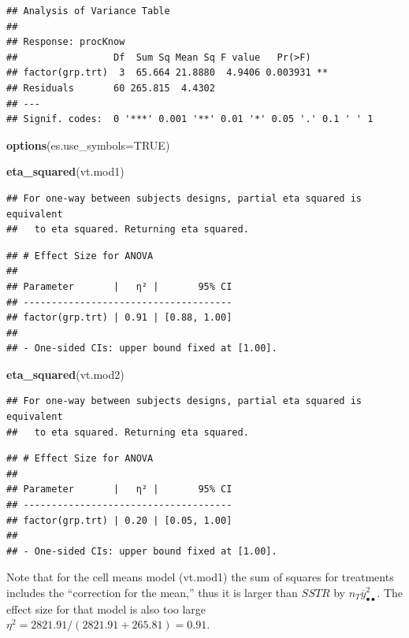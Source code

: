 \documentclass[
]{book}
\newenvironment{Shaded}{\begin{snugshade}}{\end{snugshade}}
\newcommand{\AttributeTok}[1]{\textcolor[rgb]{0.13,0.29,0.53}{#1}}
\newcommand{\ConstantTok}[1]{\textcolor[rgb]{0.56,0.35,0.01}{#1}}
\newcommand{\FunctionTok}[1]{\textcolor[rgb]{0.13,0.29,0.53}{\textbf{#1}}}
\newcommand{\NormalTok}[1]{#1}
\begin{document}
\begin{verbatim}
## Analysis of Variance Table
## 
## Response: procKnow
##                 Df  Sum Sq Mean Sq F value   Pr(>F)   
## factor(grp.trt)  3  65.664 21.8880  4.9406 0.003931 **
## Residuals       60 265.815  4.4302                    
## ---
## Signif. codes:  0 '***' 0.001 '**' 0.01 '*' 0.05 '.' 0.1 ' ' 1
\end{verbatim}

\begin{Shaded}
\begin{Highlighting}[]
\FunctionTok{options}\NormalTok{(}\AttributeTok{es.use\_symbols=}\ConstantTok{TRUE}\NormalTok{)}

\FunctionTok{eta\_squared}\NormalTok{(vt.mod1)}
\end{Highlighting}
\end{Shaded}

\begin{verbatim}
## For one-way between subjects designs, partial eta squared is equivalent
##   to eta squared. Returning eta squared.
\end{verbatim}

\begin{verbatim}
## # Effect Size for ANOVA
## 
## Parameter       |   η² |       95% CI
## -------------------------------------
## factor(grp.trt) | 0.91 | [0.88, 1.00]
## 
## - One-sided CIs: upper bound fixed at [1.00].
\end{verbatim}

\begin{Shaded}
\begin{Highlighting}[]
\FunctionTok{eta\_squared}\NormalTok{(vt.mod2)}
\end{Highlighting}
\end{Shaded}

\begin{verbatim}
## For one-way between subjects designs, partial eta squared is equivalent
##   to eta squared. Returning eta squared.
\end{verbatim}

\begin{verbatim}
## # Effect Size for ANOVA
## 
## Parameter       |   η² |       95% CI
## -------------------------------------
## factor(grp.trt) | 0.20 | [0.05, 1.00]
## 
## - One-sided CIs: upper bound fixed at [1.00].
\end{verbatim}

Note that for the cell means model (vt.mod1) the sum of squares for
treatments includes the ``correction for the mean,'' thus it is larger
than \(SSTR\) by \(n_T\overline{y}_{\bullet\bullet}^2\). The effect size
for that model is also too large
\(\eta^2=2821.91/(2821.91+265.81)=0.91\).
\end{document}
